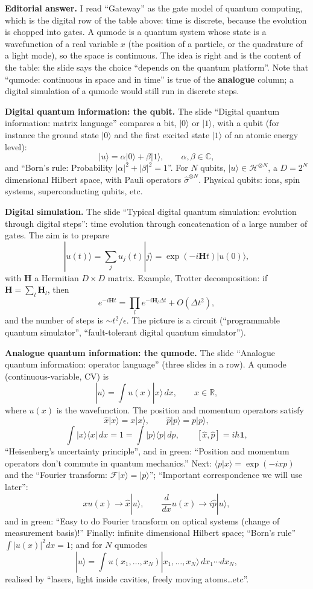 \medskip\noindent
{\bf Editorial answer.}
I read ``Gateway'' as the gate model of
quantum computing, which is the digital row
of the table above: time is discrete, because
the evolution is chopped into gates. A
qumode is a quantum system whose state is a
wavefunction of a real variable $x$ (the
position of a particle, or the quadrature of
a light mode), so the space is continuous.
The idea is right and is the content of the
table: the slide says the choice ``depends on
the quantum platform''. Note that ``qumode:
continuous in space and in time'' is true of
the {\bf analogue} column; a digital
simulation of a qumode would still run in
discrete steps.

\medskip\noindent
{\bf Digital quantum information: the qubit.}
The slide ``Digital quantum information:
matrix language'' compares a bit,
$|0\rangle$ or $|1\rangle$, with a qubit
(for instance the ground state $|0\rangle$ and
the first excited state $|1\rangle$ of an
atomic energy level):
$$
|u\rangle=\alpha|0\rangle+\beta|1\rangle,
\qquad
\alpha,\beta\in\mathbb{C},
$$
and ``Born's rule: Probability
$|\alpha|^2+|\beta|^2=1$''. For $N$ qubits,
$|u\rangle\in\mathcal{H}^{\otimes N}$, a
$D=2^N$ dimensional Hilbert space, with
Pauli operators $\hat\sigma^{\otimes N}$.
Physical qubits: ions, spin systems,
superconducting qubits, etc.

\medskip\noindent
{\bf Digital simulation.}
The slide ``Typical digital quantum
simulation: evolution through digital
steps'': time evolution through concatenation
of a large number of gates. The aim is to
prepare
$$
|u(t)\rangle=\sum_ju_j(t)|j\rangle
=\exp(-i\mathbf{H}t)|u(0)\rangle,
$$
with $\mathbf{H}$ a Hermitian $D\times D$
matrix. Example, Trotter decomposition: if
$\mathbf{H}=\sum_l\mathbf{H}_l$, then
$$
e^{-i\mathbf{H}t}
=\prod_le^{-i\mathbf{H}_l\Delta t}
+O(\Delta t^2),
$$
and the number of steps is
$\sim t^2/\epsilon$. The picture is a
circuit (``programmable quantum simulator'',
``fault-tolerant digital quantum
simulator'').

\medskip\noindent
{\bf Analogue quantum information: the
qumode.}
The slide ``Analogue quantum information:
operator language'' (three slides in a row).
A qumode (continuous-variable, CV) is
$$
|u\rangle=\int u(x)|x\rangle\,dx,
\qquad
x\in\mathbb{R},
$$
where $u(x)$ is the wavefunction. The
position and momentum operators satisfy
$$
\hat x|x\rangle=x|x\rangle,
\qquad
\hat p|p\rangle=p|p\rangle,
$$
$$
\int|x\rangle\langle x|\,dx=1
=\int|p\rangle\langle p|\,dp,
\qquad
[\hat x,\hat p]=i\hbar\mathbf{1},
$$
``Heisenberg's uncertainty principle'', and
in green: ``Position and momentum operators
don't commute in quantum mechanics.'' Next:
$\langle p|x\rangle=\exp(-ixp)$ and the
``Fourier transform: $\mathcal{F}|x\rangle
=|p\rangle$''; ``Important correspondence we
will use later'':
$$
xu(x)\to\hat x|u\rangle,
\qquad
\frac{d}{dx}u(x)\to i\hat p|u\rangle,
$$
and in green: ``Easy to do Fourier transform
on optical systems (change of measurement
basis)!'' Finally: infinite dimensional
Hilbert space; ``Born's rule''
$\int|u(x)|^2dx=1$; and for $N$ qumodes
$$
|u\rangle=\int u(x_1,\dots,x_N)
|x_1,\dots,x_N\rangle\,dx_1\cdots dx_N,
$$
realised by ``lasers, light inside cavities,
freely moving atoms\dots etc''.

